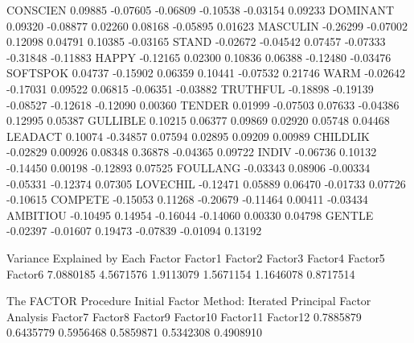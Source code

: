 \documentclass{article}
\begin{document}
\begin{Woutput}
CONSCIEN        0.09885       -0.07605       -0.06809       -0.10538       -0.03154        0.09233
DOMINANT        0.09320       -0.08877        0.02260        0.08168       -0.05895        0.01623
MASCULIN       -0.26299       -0.07002        0.12098        0.04791        0.10385       -0.03165
STAND          -0.02672       -0.04542        0.07457       -0.07333       -0.31848       -0.11883
HAPPY          -0.12165        0.02300        0.10836        0.06388       -0.12480       -0.03476
SOFTSPOK        0.04737       -0.15902        0.06359        0.10441       -0.07532        0.21746
WARM           -0.02642       -0.17031        0.09522        0.06815       -0.06351       -0.03882
TRUTHFUL       -0.18898       -0.19139       -0.08527       -0.12618       -0.12090        0.00360
TENDER          0.01999       -0.07503        0.07633       -0.04386        0.12995        0.05387
GULLIBLE        0.10215        0.06377        0.09869        0.02920        0.05748        0.04468
LEADACT         0.10074       -0.34857        0.07594        0.02895        0.09209        0.00989
CHILDLIK       -0.02829        0.00926        0.08348        0.36878       -0.04365        0.09722
INDIV          -0.06736        0.10132       -0.14450        0.00198       -0.12893        0.07525
FOULLANG       -0.03343        0.08906       -0.00334       -0.05331       -0.12374        0.07305
LOVECHIL       -0.12471        0.05889        0.06470       -0.01733        0.07726       -0.10615
COMPETE        -0.15053        0.11268       -0.20679       -0.11464        0.00411       -0.03434
AMBITIOU       -0.10495        0.14954       -0.16044       -0.14060        0.00330        0.04798
GENTLE         -0.02397       -0.01607        0.19473       -0.07839       -0.01094        0.13192

                             Variance Explained by Each Factor
   Factor1         Factor2         Factor3         Factor4         Factor5         Factor6
 7.0880185       4.5671576       1.9113079       1.5671154       1.1646078       0.8717514

The FACTOR Procedure
Initial Factor Method: Iterated Principal Factor Analysis
   Factor7         Factor8         Factor9        Factor10        Factor11        Factor12
 0.7885879       0.6435779       0.5956468       0.5859871       0.5342308       0.4908910


\end{Woutput}
\end{document}
